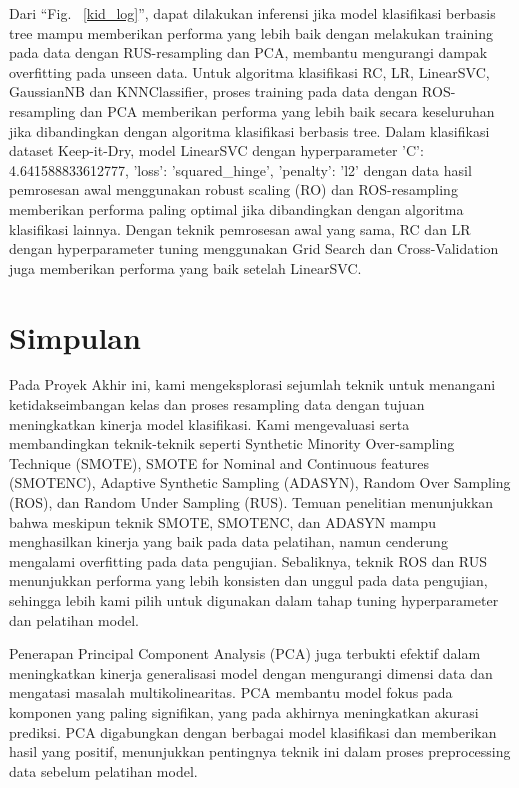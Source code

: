 \documentclass[conference]{IEEEtran}
\begin{document}
Dari ``Fig. ~\ref{kid_log}'', dapat dilakukan inferensi jika model klasifikasi berbasis tree mampu memberikan performa yang lebih baik dengan melakukan training pada data dengan RUS-resampling dan PCA, membantu mengurangi dampak overfitting pada unseen data. 
Untuk algoritma klasifikasi RC, LR, LinearSVC, GaussianNB dan KNNClassifier, proses training pada data dengan ROS-resampling dan PCA memberikan performa yang lebih baik secara keseluruhan jika dibandingkan dengan algoritma klasifikasi berbasis tree. 
Dalam klasifikasi dataset Keep-it-Dry, model LinearSVC dengan hyperparameter {'C': 4.641588833612777, 'loss': 'squared\_hinge', 'penalty': 'l2'} dengan data hasil pemrosesan awal menggunakan robust scaling (RO) dan ROS-resampling memberikan performa paling optimal 
jika dibandingkan dengan algoritma klasifikasi lainnya. Dengan teknik pemrosesan awal yang sama, RC dan LR dengan hyperparameter tuning menggunakan Grid Search dan Cross-Validation juga memberikan performa yang baik setelah LinearSVC.

\section{Simpulan}
Pada Proyek Akhir  ini, kami mengeksplorasi sejumlah teknik untuk menangani ketidakseimbangan kelas dan proses resampling data dengan tujuan meningkatkan kinerja model klasifikasi. Kami mengevaluasi serta membandingkan teknik-teknik seperti 
Synthetic Minority Over-sampling Technique (SMOTE), SMOTE for Nominal and Continuous features (SMOTENC), Adaptive Synthetic Sampling (ADASYN), Random Over Sampling (ROS), dan Random Under Sampling (RUS). Temuan penelitian menunjukkan bahwa meskipun 
teknik SMOTE, SMOTENC, dan ADASYN mampu menghasilkan kinerja yang baik pada data pelatihan, namun cenderung mengalami overfitting pada data pengujian. Sebaliknya, teknik ROS dan RUS menunjukkan performa yang lebih konsisten dan unggul pada data pengujian, sehingga 
lebih kami pilih untuk digunakan dalam tahap tuning hyperparameter dan pelatihan model.

Penerapan Principal Component Analysis (PCA) juga terbukti efektif dalam meningkatkan kinerja generalisasi model dengan mengurangi dimensi data dan mengatasi masalah multikolinearitas. PCA membantu model fokus pada komponen yang paling signifikan, 
yang pada akhirnya meningkatkan akurasi prediksi. PCA digabungkan dengan berbagai model klasifikasi dan memberikan hasil yang positif, menunjukkan pentingnya teknik ini dalam proses preprocessing data sebelum pelatihan model.
\end{document}
